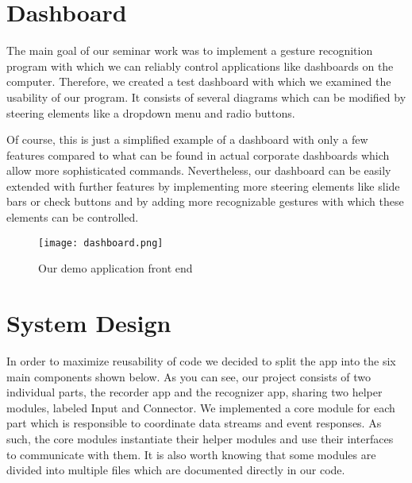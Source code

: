 \chapter{Dashboard}
\label{ch:Dashboard}

The main goal of our seminar work was to implement a gesture recognition program with which we can reliably control applications like dashboards on the computer.
Therefore, we created a test dashboard with which we examined the usability of our program.
It consists of several diagrams which can be modified by steering elements like a dropdown menu and radio buttons.

Of course, this is just a simplified example of a dashboard with only a few features compared to what can be found in actual corporate dashboards which allow more sophisticated commands.
Nevertheless, our dashboard can be easily extended with further features by implementing more steering elements like slide bars or check buttons and by adding more recognizable gestures with which these elements can be controlled.  

\begin{figure}[htp]
\begin{center}
  \texttt{[image: dashboard.png]}
\caption{Our demo application front end}
\end{center}
\end{figure} 


\chapter{System Design}
\label{ch:SystemDesign}

In order to maximize reusability of code we decided to split the app into the six main components shown below. As you can see, our project consists of two individual parts, the recorder app and the recognizer app, sharing two helper modules, labeled Input and Connector. We implemented a core module for each part which is responsible to coordinate data streams and event responses. As such, the core modules instantiate their helper modules and use their interfaces to communicate with them. It is also worth knowing that some modules are divided into multiple files which are documented directly in our code.

